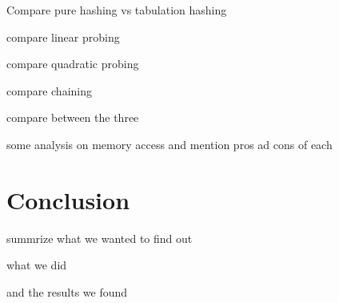 \documentclass[12pt]{article}
\begin{document}
Compare pure hashing vs tabulation hashing

compare linear probing

compare quadratic probing

compare chaining

compare between the three

some analysis on memory access  and mention pros ad cons of each


\section{Conclusion}

summrize what we wanted to find out

what we did

and the results we found



\end{document}

